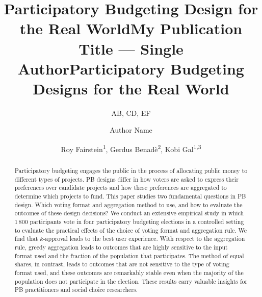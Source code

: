 \documentclass[letterpaper]{article} %
\title{Participatory Budgeting  Design for the Real World}
\author{
    AB, CD, EF
}
\title{My Publication Title --- Single Author}
\author {
    Author Name
}
\title{Participatory Budgeting  Designs for the Real World}
\author {
    Roy Fairstein\textsuperscript{\rm 1},
    Gerdus Benad\`e\textsuperscript{\rm 2},
    Kobi Gal\textsuperscript{\rm 1,3}
}
\begin{document}
\maketitle
 \begin{abstract}
 Participatory budgeting   engages     the public in the process of allocating  public money to different types of projects. 
  PB designs  differ in how voters are asked to express their preferences over candidate projects and how these preferences are aggregated to determine which projects to fund. 
  This paper studies  two fundamental questions in PB design. Which voting format and aggregation method to use, and how to evaluate the outcomes of these design decisions?
  We conduct an extensive empirical study in which $1\,800$ participants vote in four participatory budgeting elections in a controlled setting to evaluate the practical effects of the choice of voting format and aggregation rule. 
We find that $k$-approval leads to the best user experience. 
With respect to the aggregation rule, greedy aggregation leads to outcomes that are  highly sensitive to   the input format used and the fraction of the population that participates. The method of equal shares, in contrast, leads to outcomes that are not sensitive to the type of voting format used, and these outcomes are remarkably stable even when the majority of the population does not participate in the election.  These results carry valuable insights for PB practitioners and social choice researchers.

 \end{abstract}
\end{document}
